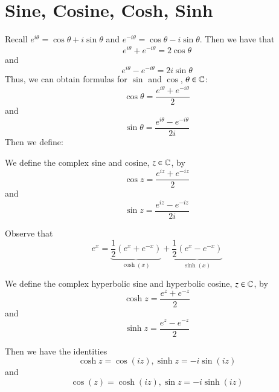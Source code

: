 \documentclass[12pt, a4paper, oneside, openright, titlepage]{book}
\begin{document}
\section{Sine, Cosine, Cosh, Sinh}

Recall $e^{i\theta} = \cos\theta +i\sin\theta$ and $e^{-i\theta} = \cos\theta-i\sin\theta$. Then we have that \begin{equation*}
    e^{i\theta}+e^{-i\theta}=2\cos\theta
\end{equation*}
and \begin{equation*}
    e^{i\theta}-e^{-i\theta} = 2i\sin\theta
\end{equation*}
Thus, we can obtain formulas for $\sin$ and $\cos$, $\theta \in \mathbb C$: \begin{equation*}
    \cos\theta = \frac{e^{i\theta}+e^{-i\theta}}{2}
\end{equation*}
and \begin{equation*}
    \sin\theta = \frac{e^{i\theta}-e^{-i\theta}}{2i}
\end{equation*}
Then we define:

\begin{defn}
    We define the complex sine and cosine, $z \in \mathbb C$, by \begin{equation}
        \boxed{\cos z = \frac{e^{iz}+e^{-iz}}{2}}
    \end{equation}
    and \begin{equation}
        \boxed{\sin z = \frac{e^{iz}-e^{-iz}}{2i}}
    \end{equation}
\end{defn}

Observe that \begin{equation*}
    e^x = \underbrace{\frac{1}{2}(e^x+e^{-x})}_{\cosh(x)} + \underbrace{\frac{1}{2}(e^x-e^{-x})}_{\sinh(x)}
\end{equation*}
\begin{defn}
    We define the complex hyperbolic sine and hyperbolic cosine, $z \in \mathbb C$, by \begin{equation}
        \boxed{\cosh z = \frac{e^{z}+e^{-z}}{2}}
    \end{equation}
    and \begin{equation}
        \boxed{\sinh z = \frac{e^{z}-e^{-z}}{2}}
    \end{equation}
\end{defn}

Then we have the identities \begin{equation*}
    \cosh z = \cos(iz), \sinh z = -i\sin(iz)
\end{equation*}
and \begin{equation*}
    \cos(z) = \cosh(iz), \sin z = -i\sinh(iz)
\end{equation*}
\end{document}
